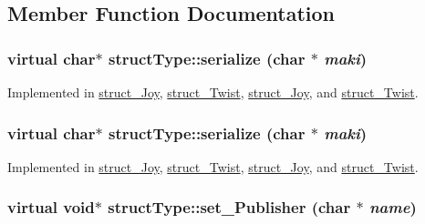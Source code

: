 \subsection{Member Function Documentation}
\hypertarget{classstructType_a515f5e08e2c7c054145d5dcce4e8adb1}{
\subsubsection[{serialize}]{\setlength{\rightskip}{0pt plus 5cm}virtual char$\ast$ structType::serialize (char $\ast$ {\em maki})}}
\label{classstructType_a515f5e08e2c7c054145d5dcce4e8adb1}


Implemented in \hyperlink{classstruct__Joy_a85a218f4a0da41e33f9bf001c12c3a5a}{struct\_\-Joy}, \hyperlink{classstruct__Twist_aee6e94e0914c89920f211a04b5ad4f9f}{struct\_\-Twist}, \hyperlink{classstruct__Joy_a0241cea32ad81ade99f9b484107e218d}{struct\_\-Joy}, and \hyperlink{classstruct__Twist_afc5c6e9e092a700e3906e67d7918d4ab}{struct\_\-Twist}.

\hypertarget{classstructType_a515f5e08e2c7c054145d5dcce4e8adb1}{
\subsubsection[{serialize}]{\setlength{\rightskip}{0pt plus 5cm}virtual char$\ast$ structType::serialize (char $\ast$ {\em maki})}}
\label{classstructType_a515f5e08e2c7c054145d5dcce4e8adb1}


Implemented in \hyperlink{classstruct__Joy_a85a218f4a0da41e33f9bf001c12c3a5a}{struct\_\-Joy}, \hyperlink{classstruct__Twist_aee6e94e0914c89920f211a04b5ad4f9f}{struct\_\-Twist}, \hyperlink{classstruct__Joy_a0241cea32ad81ade99f9b484107e218d}{struct\_\-Joy}, and \hyperlink{classstruct__Twist_afc5c6e9e092a700e3906e67d7918d4ab}{struct\_\-Twist}.

\hypertarget{classstructType_aa017fe323160d25667ed838023db944d}{
\subsubsection[{set\_\-Publisher}]{\setlength{\rightskip}{0pt plus 5cm}virtual void$\ast$ structType::set\_\-Publisher (char $\ast$ {\em name})}}
\label{classstructType_aa017fe323160d25667ed838023db944d}


